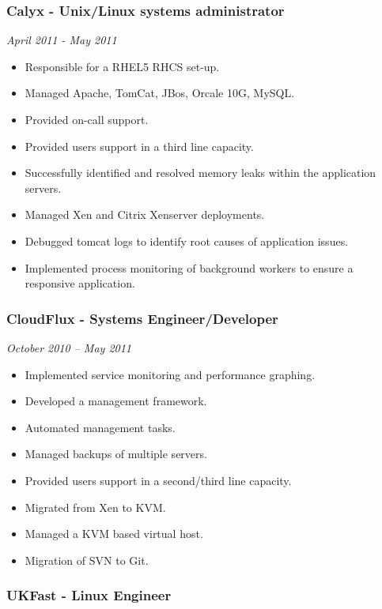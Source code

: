 \subsubsection{Calyx - Unix/Linux systems administrator}

\emph{April 2011 - May 2011}

\begin{itemize}
\item
  Responsible for a RHEL5 RHCS set-up.
\item
  Managed Apache, TomCat, JBos, Orcale 10G, MySQL.
\item
  Provided on-call support.
\item
  Provided users support in a third line capacity.
\item
  Successfully identified and resolved memory leaks within the
  application servers.
\item
  Managed Xen and Citrix Xenserver deployments.
\item
  Debugged tomcat logs to identify root causes of application issues.
\item
  Implemented process monitoring of background workers to ensure a
  responsive application.
\end{itemize}

\subsubsection{CloudFlux - Systems Engineer/Developer}

\emph{October 2010 -- May 2011}

\begin{itemize}
\item
  Implemented service monitoring and performance graphing.
\item
  Developed a management framework.
\item
  Automated management tasks.
\item
  Managed backups of multiple servers.
\item
  Provided users support in a second/third line capacity.
\item
  Migrated from Xen to KVM.
\item
  Managed a KVM based virtual host.
\item
  Migration of SVN to Git.
\end{itemize}

\subsubsection{UKFast - Linux Engineer}

